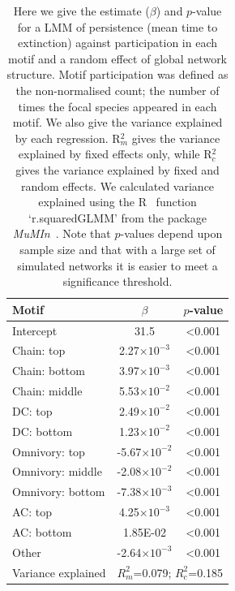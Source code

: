 \documentclass[12pt]{article}
\begin{document}
\begin{spacing}{2.0}
		\begin{table}[hb!]
    		\caption{Here we give the estimate ($\beta$) and $p$-value for a LMM of persistence (mean time to extinction) against participation in each motif and a random effect of global network structure. Motif participation was defined as the non-normalised count; the number of times the focal species appeared in each motif. We also give the variance explained by each regression. R$^{2}_{m}$ gives the variance explained by fixed effects only, while R$^{2}_{c}$ gives the variance explained by fixed and random effects. We calculated variance explained using the R~\citep{R} function `r.squaredGLMM' from the package \emph{MuMIn}~\citep{MuMIn}. Note that $p$-values depend upon sample size and that with a large set of simulated networks it is easier to meet a significance threshold.}
    		\label{tab:count_positions}
    		\begin{tabular}{l | c c}
    		Motif & $\beta$ & $p$-value \\  
    		\hline
            Intercept	&	31.5	&	\textless0.001	\\
            Chain: top	&	2.27$\times10^{-3}$	&	\textless0.001	\\
            Chain: bottom	&	3.97$\times10^{-3}$	&	\textless0.001	\\
            Chain: middle	&	5.53$\times10^{-2}$	&	\textless0.001	\\
            DC: top	&	2.49$\times10^{-2}$	&	\textless0.001	\\
            DC: bottom	&	1.23$\times10^{-2}$	&	\textless0.001	\\
            Omnivory: top	&	-5.67$\times10^{-2}$	&	\textless0.001	\\
            Omnivory: middle	&	-2.08$\times10^{-2}$	&	\textless0.001	\\
            Omnivory: bottom	&	-7.38$\times10^{-3}$	&	\textless0.001	\\
            AC: top	&	4.25$\times10^{-3}$	&	\textless0.001	\\
            AC: bottom	&	1.85E-02	&	\textless0.001	\\
            Other	&	-2.64$\times10^{-3}$	&	\textless0.001	\\
            \hline
    		Variance explained & \multicolumn{2}{c}{$R^{2}_m$=0.079; $R^2_c$=0.185} \\
    		\hline
    		\end{tabular}
    		\end{table}


\end{spacing}
\end{document}
